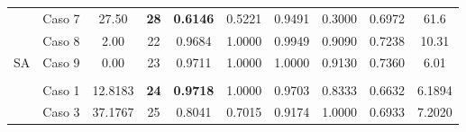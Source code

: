 \begin{table}
{\begin{tabular}{cccccccccc}
			\multicolumn{1}{c|}{}                      & Caso 7                        & 27.50                                                                & {\color[HTML]{9A0000} \textbf{28}}                                 & {\color[HTML]{9A0000} \textbf{0.6146}}                  & 0.5221                        & 0.9491                        & 0.3000                        & 0.6972                        & 61.6                                                                 \\
			\multicolumn{1}{c|}{}                      & {\color[HTML]{003532} Caso 8} & {\color[HTML]{003532} 2.00}                                          & {\color[HTML]{003532} 22}                                          & {\color[HTML]{003532} 0.9684}                           & {\color[HTML]{003532} 1.0000} & {\color[HTML]{003532} 0.9949} & {\color[HTML]{003532} 0.9090} & {\color[HTML]{003532} 0.7238} & {\color[HTML]{003532} 10.31}                                         \\
			\multicolumn{1}{c|}{\multirow{-8}{*}{SA}}  & Caso 9                        & 0.00                                                                 & 23                                                                 & 0.9711                                                  & 1.0000                        & 1.0000                        & 0.9130                        & 0.7360                        & 6.01                                                                 \\
			\multicolumn{10}{c}{}                                                                                                                                                                                                                                                                                                                                                                                                                                                                   \\
			\multicolumn{1}{c|}{}                      & {\color[HTML]{003532} Caso 1} & {\color[HTML]{003532} 12.8183}                                       & {\color[HTML]{9A0000} \textbf{24}}                                 & {\color[HTML]{9A0000} \textbf{0.9718}}                  & {\color[HTML]{003532} 1.0000} & {\color[HTML]{003532} 0.9703} & {\color[HTML]{003532} 0.8333} & {\color[HTML]{003532} 0.6632} & {\color[HTML]{003532} 6.1894}                                        \\
			\multicolumn{1}{c|}{}                      & Caso 3                        & 37.1767                                                              & 25                                                                 & 0.8041                                                  & 0.7015                        & 0.9174                        & 1.0000                        & 0.6933                        & 7.2020                                                               \\

\end{tabular}}
\end{table}
